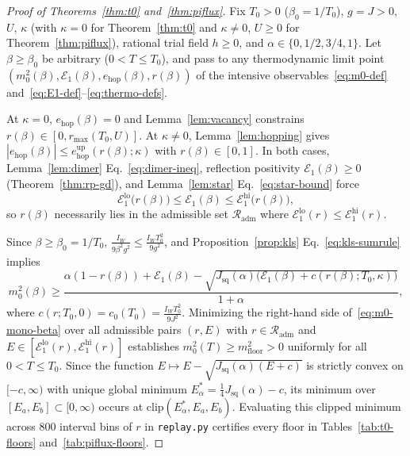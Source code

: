 \documentclass[11pt]{article}
\theoremstyle{definition}
\theoremstyle{remark}
\newcommand{\calE}{\mathcal{E}}
\begin{document}
\begin{proof}[Proof of Theorems~\ref{thm:t0} and~\ref{thm:piflux}]
Fix $T_0 > 0$ ($\beta_0 = 1/T_0$), $g = J > 0$, $U$, $\kappa$ (with $\kappa = 0$ for Theorem~\ref{thm:t0} and $\kappa \ne 0$, $U \ge 0$ for Theorem~\ref{thm:piflux}), rational trial field $h \ge 0$, and $\alpha \in \{0, 1/2, 3/4, 1\}$. Let $\beta \ge \beta_0$ be arbitrary ($0 < T \le T_0$), and pass to any thermodynamic limit point $(m_0^2(\beta), \calE_1(\beta), \allowbreak e_{\mathrm{hop}}(\beta), r(\beta))$ of the intensive observables~\eqref{eq:m0-def} and~\eqref{eq:E1-def}--\eqref{eq:thermo-defs}.

At $\kappa = 0$, $e_{\mathrm{hop}}(\beta) = 0$ and Lemma~\ref{lem:vacancy} constrains $r(\beta) \in [0, r_{\max}(T_0, U)]$. At $\kappa \ne 0$, Lemma~\ref{lem:hopping} gives $|e_{\mathrm{hop}}(\beta)| \le e_{\mathrm{hop}}^{\mathrm{up}}(r(\beta); \kappa)$ with $r(\beta) \in [0, 1]$. In both cases, Lemma~\ref{lem:dimer} Eq.~\eqref{eq:dimer-ineq}, reflection positivity $\calE_1(\beta) \ge 0$ (Theorem~\ref{thm:rp-gd}), and Lemma~\ref{lem:star} Eq.~\eqref{eq:star-bound} force
\begin{equation}\label{eq:E1-window}
\calE_1^{\mathrm{lo}}\bigl(r(\beta)\bigr) \le \calE_1(\beta) \le \calE_1^{\mathrm{hi}}\bigl(r(\beta)\bigr),
\end{equation}
so $r(\beta)$ necessarily lies in the admissible set $\mathcal{R}_{\mathrm{adm}}$ where $\calE_1^{\mathrm{lo}}(r) \le \calE_1^{\mathrm{hi}}(r)$.

Since $\beta \ge \beta_0 = 1/T_0$, $\frac{I_W}{9\beta^2 g^2} \le \frac{I_W T_0^2}{9g^2}$, and Proposition~\ref{prop:kls} Eq.~\eqref{eq:kls-sumrule} implies
\begin{equation}\label{eq:m0-mono-beta}
m_0^2(\beta) \ge \frac{\alpha(1 - r(\beta)) + \calE_1(\beta) - \sqrt{J_{\mathrm{sq}}(\alpha)\bigl(\calE_1(\beta) + c(r(\beta); T_0, \kappa)\bigr)}}{1 + \alpha},
\end{equation}
where $c(r; T_0, 0) = c_0(T_0) = \frac{I_W T_0^2}{9J^2}$. Minimizing the right-hand side of~\eqref{eq:m0-mono-beta} over all admissible pairs $(r, E)$ with $r \in \mathcal{R}_{\mathrm{adm}}$ and $E \in [\calE_1^{\mathrm{lo}}(r), \calE_1^{\mathrm{hi}}(r)]$ establishes $m_0^2(T) \ge m_{\mathrm{floor}}^2 > 0$ uniformly for all $0 < T \le T_0$. Since the function $E \mapsto E - \sqrt{J_{\mathrm{sq}}(\alpha)(E + c)}$ is strictly convex on $[-c, \infty)$ with unique global minimum $E_\alpha^* = \frac{1}{4}J_{\mathrm{sq}}(\alpha) - c$, its minimum over $[E_a, E_b] \subset [0, \infty)$ occurs at $\mathrm{clip}(E_\alpha^*, E_a, E_b)$. Evaluating this clipped minimum across 800 interval bins of $r$ in \texttt{replay.py} certifies every floor in Tables~\ref{tab:t0-floors} and~\ref{tab:piflux-floors}.
\end{proof}
\end{document}
